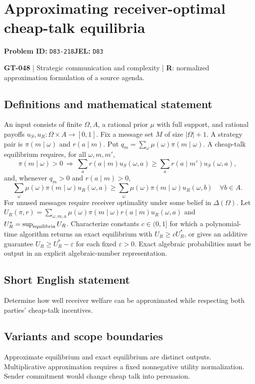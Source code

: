 \documentclass[11pt,a4paper]{article}
\begin{document}
\section*{Approximating receiver-optimal cheap-talk equilibria}
\textbf{Problem ID:} \texttt{D83-218}\quad \textbf{JEL:} \texttt{D83}\par
\label{problem:OP-0178}
\label{game:GT-048}
{\sffamily\small\color{muted}
\textbf{GT-048} | Strategic communication and complexity | \textbf{R}: normalized approximation formulation of a source agenda.
\par}
\subsection*{Definitions and mathematical statement}
An input consists of finite $\Omega,A$, a rational prior $\mu$ with full support, and rational payoffs $u_S,u_R:\Omega\times A\to[0,1]$. Fix a message set $M$ of size $|\Omega|+1$. A strategy pair is $\pi(m\mid\omega)$ and $r(a\mid m)$. Put $q_m=\sum_\omega\mu(\omega)\pi(m\mid\omega)$. A cheap-talk equilibrium requires, for all $\omega,m,m'$,
\[
 \pi(m\mid\omega)>0\ \Longrightarrow\
 \sum_a r(a\mid m)u_S(\omega,a)\geq\sum_a r(a\mid m')u_S(\omega,a),
\]
and, whenever $q_m>0$ and $r(a\mid m)>0$,
\[
 \sum_\omega\mu(\omega)\pi(m\mid\omega)u_R(\omega,a)
 \geq\sum_\omega\mu(\omega)\pi(m\mid\omega)u_R(\omega,b)
 \quad\forall b\in A.
\]
For unused messages require receiver optimality under some belief in $\Delta(\Omega)$. Let $U_R(\pi,r)=\sum_{\omega,m,a}\mu(\omega)\pi(m\mid\omega)r(a\mid m)u_R(\omega,a)$ and $U_R^*=\sup_{\rm equilibria}U_R$. Characterize constants $c\in(0,1]$ for which a polynomial-time algorithm returns an exact equilibrium with $U_R\geq cU_R^*$, or gives an additive guarantee $U_R\geq U_R^*-\varepsilon$ for each fixed $\varepsilon>0$. Exact algebraic probabilities must be output in an explicit algebraic-number representation.
\subsection*{Short English statement}
Determine how well receiver welfare can be approximated while respecting both parties' cheap-talk incentives.
\subsection*{Variants and scope boundaries}
Approximate equilibrium and exact equilibrium are distinct outputs. Multiplicative approximation requires a fixed nonnegative utility normalization. Sender commitment would change cheap talk into persuasion.
\end{document}
